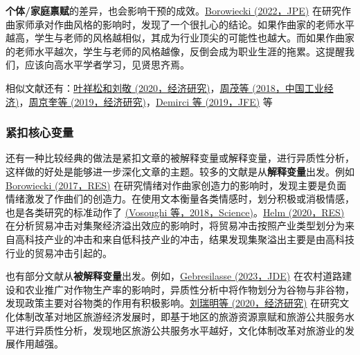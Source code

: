 \documentclass[11pt,a4paper]{ctexart}
\begin{document}
\textbf{个体/家庭禀赋}的差异，也会影响干预的成效。\href{https://www.journals.uchicago.edu/doi/ftextbfl/10.1086/718370}{Borowiecki
(2022，JPE)}
在研究作曲家师承对作曲风格的影响时，发现了一个很扎心的结论。如果作曲家的老师水平越高，学生与老师的风格越相似，其成为行业顶尖的可能性也越大。而如果作曲家的老师水平越次，学生与老师的风格越像，反倒会成为职业生涯的拖累。这提醒我们，应该向高水平学者学习，见贤思齐焉。

相似文献还有：\href{https://t.cnki.net/kcms/detail?v=3uoqIhG8C44YLTlOAiTRKibYlV5Vjs7i8oRR1PAr7RxjuAJk4dHXoqec8_rQcQP1J9uHTypxShJhp9rggudMugqBNLqEznwr&uniplatform=NZKPT}{叶祥松和刘敬
(2020，经济研究)}，\href{https://t.cnki.net/kcms/detail?v=3uoqIhG8C44YLTlOAiTRKibYlV5Vjs7i0-kJR0HYBJ80QN9L51zrP00IKfnBCnn8rS7_Ixewwvo9sVDGzin6KOg-jos_suH0&uniplatform=NZKPT}{周茂等
(2018，中国工业经济)}，\href{https://t.cnki.net/kcms/detail?v=3uoqIhG8C44YLTlOAiTRKibYlV5Vjs7iLik5jEcCI09uHa3oBxtWoHGwy9XepWzLINg1XaaKgTrp4UZaoB2oNhHhTzF3KVmz&uniplatform=NZKPT}{周京奎等
(2019，经济研究)}，\href{https://www.sciencedirect.com/science/article/pii/S0304405X19300637?casa_token=_inpPjlmZ9EAAAAA:MwGvWPa_E7ybSAPLvLaWbIvu74p1FgZ8EnTuXS3uashg12d--Wa15fkJRsxC2OqLrRqyUjbGoA}{Demirci
等 (2019，JFE)} 等

\subsubsection{紧扣核心变量}

还有一种比较经典的做法是紧扣文章的被解释变量或解释变量，进行异质性分析，这样做的好处是能够进一步深化文章的主题。较多的文献是从\textbf{解释变量}出发。例如
\href{https://direct.mit.edu/rest/article-abstract/99/4/591/58378/How-Are-You-My-Dearest-Mozart-Well-Being-and?redirectedFrom=ftextbfltext}{Borowiecki
(2017，RES)}
在研究情绪对作曲家创造力的影响时，发现主要是负面情绪激发了作曲们的创造力。在使用文本衡量各类情感时，划分积极或消极情感，也是各类研究的标准动作了
\href{https://www.science.org/doi/ftextbfl/10.1126/science.aap9559?casa_token=nPhhNQdzzDcAAAAA\%3AcN4xVcfsuhuMz62GinehIMSf34aQQHeZQI4BuIUzqYy7MuDRUI5h1u_0mWonLWHreEY3vMQkoDnDwg}{(Vosoughi
等，2018，Science)}。\href{https://academic.oup.com/restud/article/87/3/1399/5610540}{Helm
(2020，RES)}
在分析贸易冲击对集聚经济溢出效应的影响时，将贸易冲击按照产业类型划分为来自高科技产业的冲击和来自低科技产业的冲击，结果发现集聚溢出主要是由高科技行业的贸易冲击引起的。

也有部分文献从\textbf{被解释变量}出发。例如，\href{https://doi.org/10.1016/j.jdeveco.2023.103048}{Gebresilasse
(2023，JDE)}
在农村道路建设和农业推广对作物生产率的影响时，异质性分析中将作物划分为谷物与非谷物，发现政策主要对谷物类的作用有积极影响。\href{https://t.cnki.net/kcms/detail?v=3uoqIhG8C44YLTlOAiTRKibYlV5Vjs7i8oRR1PAr7RxjuAJk4dHXoqec8_rQcQP15zusuZbtzhbDEWY6CyK_Jhg1aB03Yr5S&uniplatform=NZKPT}{刘瑞明等
(2020，经济研究)}
在研究文化体制改革对地区旅游经济发展时，即基于地区的旅游资源禀赋和旅游公共服务水平进行异质性分析，发现地区旅游公共服务水平越好，文化体制改革对旅游业的发展作用越强。
\end{document}
